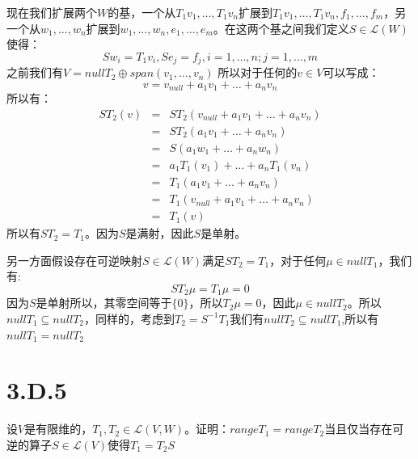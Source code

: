 \documentclass[10pt,a4paper,UTF8]{article}
\begin{document}
\begin{answer}
现在我们扩展两个\(W\)的基，一个从\(T_{1}v_{1},\ldots ,T_{1}v_{n}\)扩展到\(T_{1}v_{1},\ldots ,T_{1}v_{n},f_{1},\ldots ,f_{m}\)，另一个从\(w_{1},\ldots ,w_{n}\)扩展到\(w_{1},\ldots ,w_{n},e_{1},\ldots ,e_{m}\)。在这两个基之间我们定义\(S\in \mathcal{L}(W)\)使得：
\begin{equation}
\label{eq:9}
Sw_{i} = T_{1}v_{i},Se_{j} = f_{j},i=1,\ldots ,n;j=1,\ldots ,m
\end{equation}
之前我们有\(V = nullT_{2} \oplus  span(v_{1},\ldots ,v_{n})\) 所以对于任何的\(v\in V\)可以写成：
\begin{equation}
\label{eq:10}
v = v_{null} + a_{1}v_{1} + \ldots + a_{n}v_{n}
\end{equation}
所以有：
\begin{eqnarray*}
ST_{2}(v)&=&ST_{2}(v_{null} + a_{1}v_{1} + \ldots + a_{n}v_{n}) \\
&=& ST_{2}(a_{1}v_{1} + \ldots + a_{n}v_{n}) \\
&=& S(a_{1}w_{1} + \ldots + a_{n}w_{n}) \\
&=&a_{1}T_{1}(v_{1}) + \ldots + a_{n}T_{1}(v_{n}) \\
&=&T_{1}(a_{1}v_{1} + \ldots + a_{n}v_{n}) \\
&=& T_{1}(v_{null} + a_{1}v_{1} + \ldots +a_{n}v_{n}) \\
&=& T_{1}(v)
\end{eqnarray*}
所以有\(ST_{2} = T_{1}\)。因为\(S\)是满射，因此\(S\)是单射。

另一方面假设存在可逆映射\(S\in \mathcal{L}(W)\)满足\(ST_{2} = T_{1}\)，对于任何\(\mu \in nullT_{1}\)，我们有:
\begin{equation}
\label{eq:12}
ST_{2}\mu = T_{1}\mu =0
\end{equation}
因为\(S\)是单射所以，其零空间等于\(\{0\}\)，所以\(T_{2}\mu =0\)，因此\(\mu \in nullT_{2}\)。所以\(nullT_{1} \subseteq nullT_{2}\)，同样的，考虑到\(T_{2} = S^{-1}T_{1}\)我们有\(nullT_{2}\subseteq nullT_{1}\),所以有\(nullT_{1} = nullT_{2}\)
\end{answer}
\section{3.D.5}
\label{sec:orgf241725}


\begin{problem}
设\(V\)是有限维的，\(T_{1},T_{2}\in \mathcal{L}(V,W)\)。证明：\(range T_{1} = rangeT_{2}\)当且仅当存在可逆的算子\(S\in \mathcal{L}(V)\)使得\(T_{1} = T_{2}S\)
\end{problem}
\end{document}
